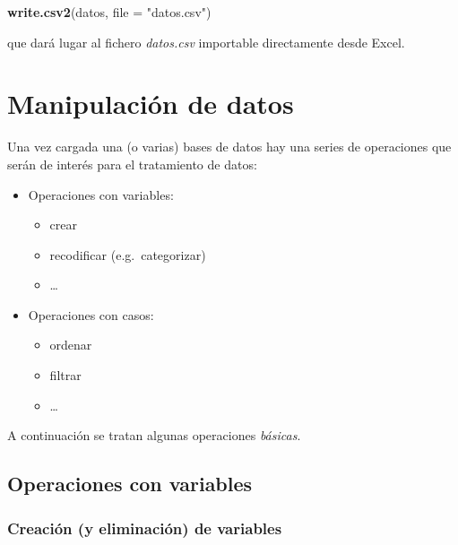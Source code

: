 \documentclass[]{book}
\newenvironment{Shaded}{\begin{snugshade}}{\end{snugshade}}
\newcommand{\KeywordTok}[1]{\textcolor[rgb]{0.13,0.29,0.53}{\textbf{#1}}}
\newcommand{\DataTypeTok}[1]{\textcolor[rgb]{0.13,0.29,0.53}{#1}}
\newcommand{\StringTok}[1]{\textcolor[rgb]{0.31,0.60,0.02}{#1}}
\newcommand{\NormalTok}[1]{#1}
\providecommand{\tightlist}{%
  \setlength{\itemsep}{0pt}\setlength{\parskip}{0pt}}
\begin{document}
\begin{Shaded}
\begin{Highlighting}[]
\KeywordTok{write.csv2}\NormalTok{(datos, }\DataTypeTok{file =} \StringTok{"datos.csv"}\NormalTok{)}
\end{Highlighting}
\end{Shaded}

que dará lugar al fichero \emph{datos.csv} importable directamente desde
Excel.

\section{Manipulación de datos}\label{manipulacion-de-datos}

Una vez cargada una (o varias) bases de datos hay una series de
operaciones que serán de interés para el tratamiento de datos:

\begin{itemize}
\tightlist
\item
  Operaciones con variables:

  \begin{itemize}
  \tightlist
  \item
    crear
  \item
    recodificar (e.g.~categorizar)
  \item
    \ldots{}
  \end{itemize}
\item
  Operaciones con casos:

  \begin{itemize}
  \tightlist
  \item
    ordenar
  \item
    filtrar
  \item
    \ldots{}
  \end{itemize}
\end{itemize}

A continuación se tratan algunas operaciones \emph{básicas}.

\subsection{Operaciones con variables}\label{operaciones-con-variables}

\subsubsection{Creación (y eliminación) de
variables}\label{creacion-y-eliminacion-de-variables}
\end{document}
